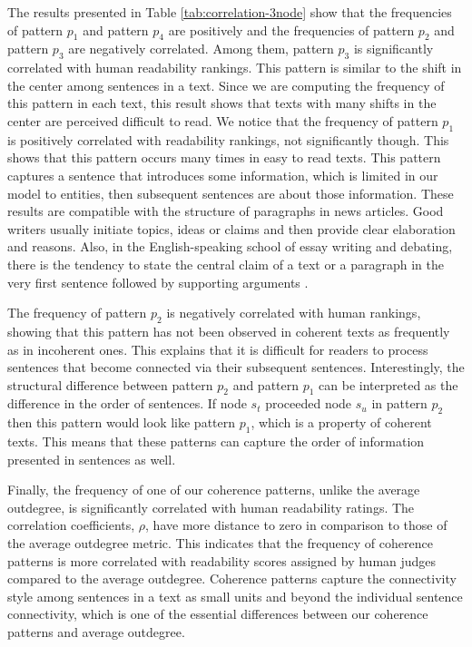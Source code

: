 The results presented in Table \ref{tab:correlation-3node} show that the frequencies of pattern $p_1$ and pattern $p_4$ are positively and the frequencies of pattern $p_2$ and pattern $p_3$ are negatively correlated. 
Among them, pattern $p_3$ is significantly correlated with human readability rankings. 
This pattern is similar to the shift in the center among sentences in a text. 
Since we are computing the frequency of this pattern in each text, this result shows that texts with many shifts in the center are perceived difficult to read. 
We notice that the frequency of pattern $p_1$ is positively correlated with readability rankings, not significantly though. 
This shows that this pattern occurs many times in easy to read texts.  
This pattern captures a sentence that introduces some information, which is limited in our model to entities, then  subsequent sentences are about those information. 
These results are compatible with the structure of paragraphs in news articles. 
Good writers usually initiate topics, ideas or claims and then provide clear elaboration and reasons. 
Also, in the English-speaking school of essay writing and debating, there is the tendency to state the central claim of a text or a paragraph in the very first sentence followed by supporting arguments \cite{peldszus15}. 

The frequency of pattern $p_2$ is negatively correlated with human rankings, showing that this pattern has not been observed in coherent texts as frequently as in incoherent ones. 
This explains that it is difficult for readers to process sentences that become connected via their  subsequent sentences.  
Interestingly, the structural difference between pattern $p_2$ and pattern $p_1$ can be interpreted as the difference in the order of sentences. 
If node $s_t$ proceeded node $s_u$ in pattern $p_2$ then this pattern would look like pattern $p_1$, which is a property of coherent texts. 
This means that these patterns can capture the order of information presented in sentences as well. 

Finally, the frequency of one of our coherence patterns, unlike the average outdegree, is significantly correlated with human readability ratings. 
The correlation coefficients, $\rho$, have more distance to zero in comparison to those of the average outdegree metric. 
This indicates that the frequency of coherence patterns is more correlated with readability scores assigned by human judges compared to the average outdegree.  
Coherence patterns capture the connectivity style among sentences in a text as small units and beyond the individual sentence connectivity, which is one of the essential differences between our coherence patterns and average outdegree. 

